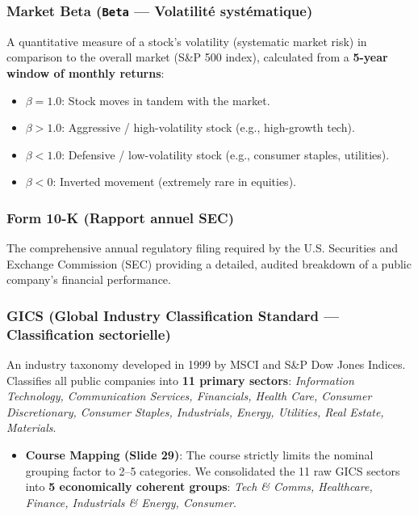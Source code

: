\documentclass[
]{article}
\providecommand{\tightlist}{%
  \setlength{\itemsep}{0pt}\setlength{\parskip}{0pt}}
\begin{document}
\subsubsection{\texorpdfstring{Market Beta (\texttt{Beta} --- Volatilité
systématique)}{Market Beta (Beta --- Volatilité systématique)}}\label{market-beta-beta-volatilituxe9-systuxe9matique}

A quantitative measure of a stock's volatility (systematic market risk)
in comparison to the overall market (S\&P 500 index), calculated from a
\textbf{5-year window of monthly returns}:

\begin{itemize}
\tightlist
\item
  \(\beta = 1.0\): Stock moves in tandem with the market.
\item
  \(\beta > 1.0\): Aggressive / high-volatility stock (e.g., high-growth
  tech).
\item
  \(\beta < 1.0\): Defensive / low-volatility stock (e.g., consumer
  staples, utilities).
\item
  \(\beta < 0\): Inverted movement (extremely rare in equities).
\end{itemize}

\subsubsection{Form 10-K (Rapport annuel
SEC)}\label{form-10-k-rapport-annuel-sec}

The comprehensive annual regulatory filing required by the U.S.
Securities and Exchange Commission (SEC) providing a detailed, audited
breakdown of a public company's financial performance.

\subsubsection{GICS (Global Industry Classification Standard ---
Classification
sectorielle)}\label{gics-global-industry-classification-standard-classification-sectorielle}

An industry taxonomy developed in 1999 by MSCI and S\&P Dow Jones
Indices. Classifies all public companies into \textbf{11 primary
sectors}: \emph{Information Technology, Communication Services,
Financials, Health Care, Consumer Discretionary, Consumer Staples,
Industrials, Energy, Utilities, Real Estate, Materials}.

\begin{itemize}
\tightlist
\item
  \textbf{Course Mapping (Slide 29)}: The course strictly limits the
  nominal grouping factor to 2--5 categories. We consolidated the 11 raw
  GICS sectors into \textbf{5 economically coherent groups}: \emph{Tech
  \& Comms, Healthcare, Finance, Industrials \& Energy, Consumer}.
\end{itemize}
\end{document}
